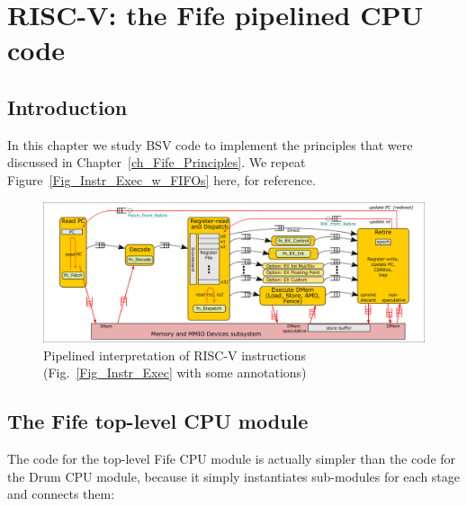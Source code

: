 

\chapter{RISC-V: the Fife pipelined CPU code}


\setcounter{page}{1}
\renewcommand{\thepage}{\arabic{chapter}-\arabic{page}}

\label{ch_Fife_code}


\section{Introduction}

In this chapter we study BSV code to implement the principles that
were discussed in Chapter~\ref{ch_Fife_Principles}.
We repeat Figure~\ref{Fig_Instr_Exec_w_FIFOs} here, for reference.
\begin{figure}[htbp]
  \centerline{\includegraphics[width=6in,angle=0]{Figures/Fig_Instr_Exec_w_FIFOs}}
  \caption{\label{Fig_Instr_Exec_w_FIFOs_2}
                  Pipelined interpretation of RISC-V instructions
		  (Fig.~\ref{Fig_Instr_Exec} with some annotations)}
\end{figure}


\section{The Fife top-level CPU module}

\label{Sec_Fife_CPU_module}

The code for the top-level Fife CPU module is actually simpler than
the code for the Drum CPU module, because it simply instantiates
sub-modules for each stage and connects them:

